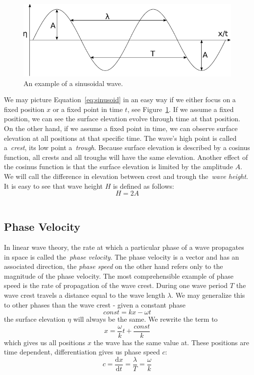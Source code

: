 \begin{figure}[b]
	\centering
	\includegraphics[width=\textwidth]{figures/sinusoid}
	\caption{An example of a sinusoidal wave.}
	\label{fig:sinusoid}
\end{figure}
%
We may picture Equation~\ref{eq:sinusoid} in an easy way if we either focus on a
fixed position $x$ or a fixed point in time $t$, see Figure~\ref{fig:sinusoid}.
If we assume a fixed position, we can see the surface elevation evolve through
time at that position. On the other hand, if we assume a fixed point in time, we
can observe surface elevation at all positions at that specific time. The wave's
high point is called a~\emph{crest}, its low point a~\emph{trough}. Because
surface elevation is described by a cosinus function, all crests and all troughs
will have the same elevation. Another effect of the cosinus function is that the
surface elevation is limited by the amplitude $A$. We will call the difference
in elevation between crest and trough the~\emph{wave height}. It is easy to see
that wave height $H$ is defined as follows:
\begin{equation}
 H = 2A
\end{equation}
\\

\subsection{Phase Velocity}
\label{sec:phase_velocity}
In linear wave theory, the rate at which a particular phase of a wave propagates in space is called
the~\emph{phase velocity}. The phase velocity is a vector and has an associated direction,
the \emph{phase speed} on the other hand refers only to the magnitude of the phase velocity.
The most comprehensible example of phase speed is the rate of propagation of the wave crest.
During one wave period $T$ the wave crest travels a distance equal to the wave length $\lambda$.
We may generalize this to other phases than the wave crest - given a constant phase
\begin{equation}
  const = kx - \omega t
\end{equation}
the surface elevation $\eta$ will always be the same. We rewrite the term to
\begin{equation}
  x = \frac{\omega}{k}t + \frac{const}{k}
\end{equation}
which gives us all positions $x$ the wave has the same value at. These positions are time dependent,
differentiation gives us phase speed $c$:
\begin{equation}
  c = \frac{\mathrm dx}{\mathrm dt} = \frac{\lambda}{T} = \frac{\omega}{k}
\end{equation}

